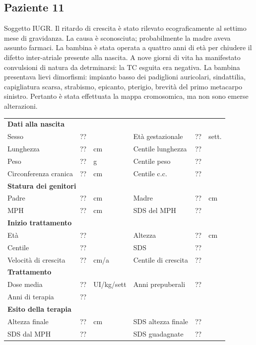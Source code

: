 \subsection*{Paziente 11}%


Soggetto IUGR. Il ritardo di crescita è stato rilevato ecograficamente al settimo mese di gravidanza. La causa è sconosciuta; probabilmente la madre aveva assunto farmaci. La bambina è stata operata a quattro anni di età per chiudere il difetto inter-atriale presente alla nascita. A nove giorni di vita ha manifestato convulsioni di natura da detrminarsi: la TC esguita era negativa. La bambina presentava lievi dimorfismi: impianto basso dei padiglioni auricolari, sindattilia, capigliatura scarsa, strabismo, epicanto, pterigio, brevità del primo metacarpo sinistro. Pertanto è stata effettuata la mappa cromosomica, ma non sono emerse alterazioni.   



\begin{table}[!h]
\begin{tabular}{lrllrl}
\toprule
\multicolumn{6}{l}{\textbf{Dati alla nascita}}\\
Sesso 		& \multicolumn{2}{l}{??} 	& Età gestazionale 		& ?? 		& sett.\\
Lunghezza 	& ?? 		& cm 				& Centile lunghezza		& ?? 		\\
Peso 		& ?? 		& g					& Centile peso			& ?? 		\\
Circonferenza cranica	& ?? 		& cm 	& Centile c.c.			& ?? \\
\midrule
\multicolumn{6}{l}{\textbf{Statura dei genitori}}\\
Padre 		& ?? & cm 	& Madre 				& ?? & cm \\
MPH 		& ?? & cm 	& SDS del MPH 			& ??\\
\midrule
\multicolumn{6}{l}{\textbf{Inizio trattamento}} \\
Età	& ?? & 		& Altezza 				& ?? & cm  \\
Centile & ?? 	 &		& SDS		& ?? \\
Velocità di crescita & ?? & cm/a	& Centile di crescita & ??\\
\midrule
\multicolumn{6}{l}{\textbf{Trattamento}} \\
Dose media		& ?? & UI/kg/sett & Anni prepuberali & ??\\
Anni di terapia & ??\\
\midrule
\multicolumn{6}{l}{\textbf{Esito della terapia}} \\
Altezza finale			& ?? & cm 	& SDS altezza finale		& ??\\
SDS dal MPH				& ?? &		& SDS guadagnate 			& ??\\
\bottomrule
\end{tabular}
\end{table}
\clearpage


